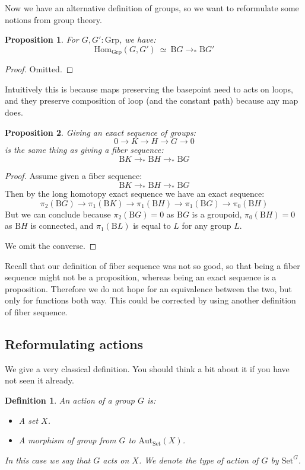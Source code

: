 \documentclass{article}
\newcommand{\sse}[1]{\medbreak \subsection{#1}}
\renewcommand{\r}{\rightarrow}
\newcommand{\Grp}{\mathrm{Grp}}
\newcommand{\Hom}{\mathrm{Hom}}
\newcommand{\B}{\mathrm{B}}
\newcommand{\Aut}{\mathrm{Aut}}
\newcommand{\Set}{\mathrm{Set}}
\newtheorem{definition}{Definition}
\newtheorem{proposition}{Proposition}
\begin{document}
Now we have an alternative definition of groups, so we want to reformulate some notions from group theory.

\begin{proposition}
For $G,G':\Grp$, we have:
\[\Hom_\Grp(G,G') \ \simeq \ \B G\r_* \B G'\]
\end{proposition}
\begin{proof}
Omitted.
\end{proof}

Intuitively this is because maps preserving the basepoint need to acts on loops, and they preserve composition of loop (and the constant path) because any map does.

\begin{proposition}
Giving an exact sequence of groups:
\[0\r K \r H\r  G\r 0 \]
is the same thing as giving a fiber sequence:
\[\B K \r_*\B H\r_*\B G\]
\end{proposition}
\begin{proof}
Assume given a fiber sequence:
\[\B K \r_*\B H\r_*\B G\]
Then by the long homotopy exact sequence we have an exact sequence:
\[\pi_2(\B G)\r \pi_1(\B K) \r \pi_1(\B H) \r \pi_1(\B G) \r \pi_0(\B H)\]
But we can conclude because $\pi_2(\B G) = 0$ as $\B G$ is a groupoid, $\pi_0(\B H) = 0$ as $\B H$ is connected, and $\pi_1(\B L)$ is equal to $L$ for any group $L$.
 
We omit the converse.
\end{proof}

Recall that our definition of fiber sequence was not so good, so that being a fiber sequence might not be a proposition, whereas being an exact sequence is a proposition. Therefore we do not hope for an equivalence between the two, but only for functions both way. This could be corrected by using another definition of fiber sequence.



\sse{Reformulating actions}

We give a very classical definition. You should think a bit about it if you have not seen it already.

\begin{definition}
An action of a group $G$ is:
\begin{itemize}
\item A set $X$.
\item A morphism of group from $G$ to $\Aut_\Set(X)$.
\end{itemize}
In this case we say that $G$ acts on $X$. We denote the type of action of $G$ by $\Set^G$.
\end{definition}
\end{document}
